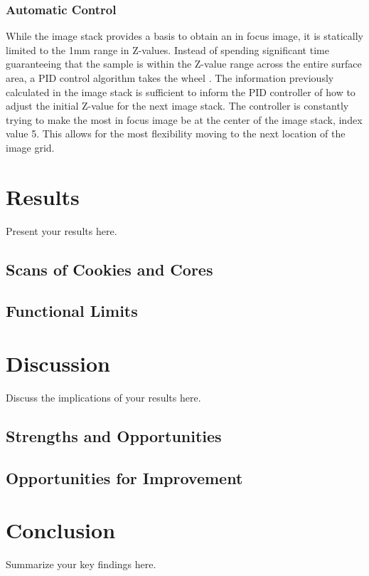 \documentclass[a4paper,12pt]{article}
\begin{document}
\subsubsection{Automatic Control}
While the image stack provides a basis to obtain an in focus image, it is statically limited to the 1mm range in Z-values. Instead of spending significant time guaranteeing that the sample
is within the Z-value range across the entire surface area, a PID control algorithm takes the wheel \citep{odwyer_summary_2000}. The information previously calculated in the image stack is sufficient 
to inform the PID controller of how to adjust the initial Z-value for the next image stack. The controller is constantly trying to make the most in focus image be at the center of the image stack,
index value 5. This allows for the most flexibility moving to the next location of the image grid. 


\section{Results}
Present your results here.

\subsection{Scans of Cookies and Cores}

\subsection{Functional Limits}

\section{Discussion}
Discuss the implications of your results here.

\subsection{Strengths and Opportunities}

\subsection{Opportunities for Improvement}

\section{Conclusion}
Summarize your key findings here.



\end{document}

